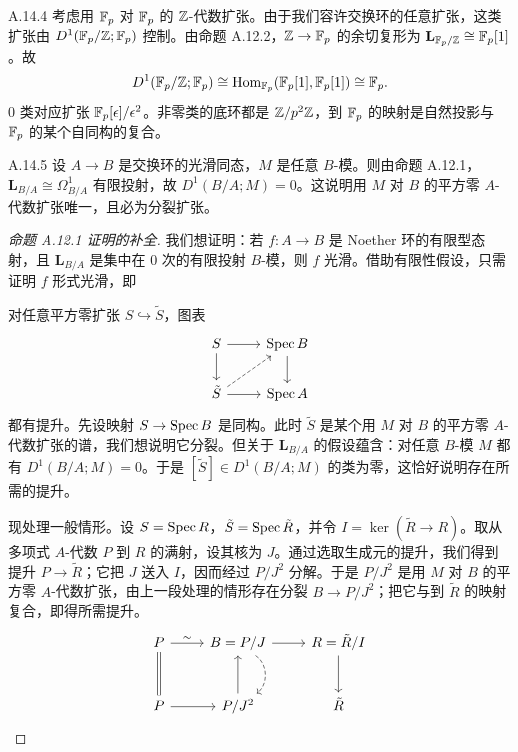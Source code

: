 \begin{exam}{A.14.4}\label{thm:a6-08-3}
考虑用 $\mathbb{F}_p$ 对 $\mathbb{F}_p$ 的 $\mathbb{Z}$-代数扩张。由于我们容许交换环的任意扩张，这类扩张由 $D^1(\mathbb{F}_p/\mathbb{Z};\mathbb{F}_p)$ 控制。由命题 A.12.2，$\mathbb{Z}\to\mathbb{F}_p$ 的余切复形为 $\mathbf L_{\mathbb{F}_p/\mathbb{Z}}\cong\mathbb{F}_p[1]$。故
\[
D^1(\mathbb{F}_p/\mathbb{Z};\mathbb{F}_p)\cong\operatorname{Hom}_{\mathbb{F}_p}(\mathbb{F}_p[1],\mathbb{F}_p[1])\cong\mathbb{F}_p.
\]
0 类对应扩张 $\mathbb{F}_p[\epsilon]/\epsilon^2$。非零类的底环都是 $\mathbb{Z}/p^2\mathbb{Z}$，到 $\mathbb{F}_p$ 的映射是自然投影与 $\mathbb{F}_p$ 的某个自同构的复合。
\end{exam}

\begin{exam}{A.14.5}\label{thm:a6-08-4}
设 $A\to B$ 是交换环的光滑同态，$M$ 是任意 $B$-模。则由命题 A.12.1，$\mathbf L_{B/A}\cong\Omega^1_{B/A}$ 有限投射，故 $D^1(B/A;M)=0$。这说明用 $M$ 对 $B$ 的平方零 $A$-代数扩张唯一，且必为分裂扩张。
\end{exam}


\begin{proof}[命题 A.12.1 证明的补全]
我们想证明：若 $f\colon A\to B$ 是 Noether 环的有限型态射，且 $\mathbf L_{B/A}$ 是集中在 0 次的有限投射 $B$-模，则 $f$ 光滑。借助有限性假设，只需证明 $f$ 形式光滑，即


对任意平方零扩张 $S\hookrightarrow\tilde S$，图表
\[
\begin{tikzcd}
S \arrow[r] \arrow[d] & \Spec B \arrow[d] \\
\tilde S \arrow[r] \arrow[ur, dashed] & \Spec A
\end{tikzcd}
\]
都有提升。先设映射 $S\to\operatorname{Spec} B$ 是同构。此时 $\tilde S$ 是某个用 $M$ 对 $B$ 的平方零 $A$-代数扩张的谱，我们想说明它分裂。但关于 $\mathbf L_{B/A}$ 的假设蕴含：对任意 $B$-模 $M$ 都有 $D^1(B/A;M)=0$。于是 $[\tilde S]\in D^1(B/A;M)$ 的类为零，这恰好说明存在所需的提升。

现处理一般情形。设 $S=\operatorname{Spec} R$，$\tilde S=\operatorname{Spec}\tilde R$，并令 $I=\ker(\tilde R\to R)$。取从多项式 $A$-代数 $P$ 到 $R$ 的满射，设其核为 $J$。通过选取生成元的提升，我们得到提升 $P\to\tilde R$；它把 $J$ 送入 $I$，因而经过 $P/J^2$ 分解。于是 $P/J^2$ 是用 $M$ 对 $B$ 的平方零 $A$-代数扩张，由上一段处理的情形存在分裂 $B\to P/J^2$；把它与到 $\tilde R$ 的映射复合，即得所需提升。
\[
\begin{tikzcd}[row sep=large]
P \arrow[r, "\sim"] \arrow[d, equal] & B=P/J \arrow[r] \arrow[d, dashed, bend left=55] & R=\tilde R/I \arrow[d] \\
P \arrow[r] & P/J^2 \arrow[u] & \tilde R
\end{tikzcd}
\]
\end{proof}


